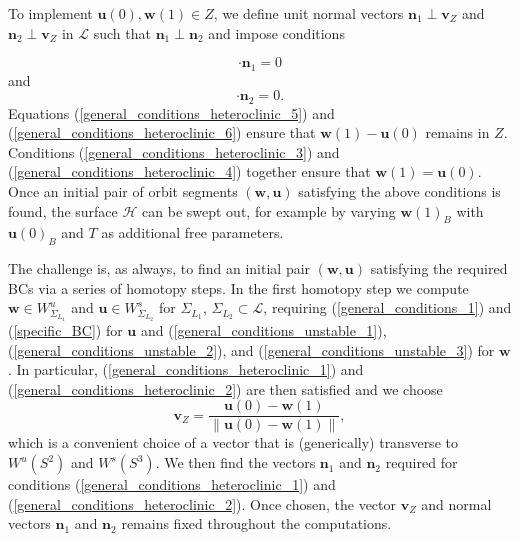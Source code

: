 \documentclass{ws-ijbc}
\begin{document}
To implement $\mathbf{u}(0), \mathbf{w}(1) \in Z$, we define unit normal vectors $\mathbf{n}_1 \perp \mathbf{v}_Z$ and $\mathbf{n}_2 \perp \mathbf{v}_Z$ in $\mathscr{L}$ such that $\mathbf{n}_1 \perp \mathbf{n}_2$ and impose conditions

\begin{equation}
	[\mathbf{u}(0) - \mathbf{w}(1)] \cdot \mathbf{n}_1 =0
	\label{general_conditions_heteroclinic_5}
\end{equation}
and
\begin{equation}	
	 [\mathbf{u}(0) - \mathbf{w}(1)] \cdot \mathbf{n}_2 =0.
	 \label{general_conditions_heteroclinic_6}
\end{equation}
Equations (\ref{general_conditions_heteroclinic_5}) and (\ref{general_conditions_heteroclinic_6}) ensure that $\mathbf{w}(1)-\mathbf{u}(0)$ remains in $Z$.  Conditions (\ref{general_conditions_heteroclinic_3}) and (\ref{general_conditions_heteroclinic_4}) together ensure that $\mathbf{w}(1) = \mathbf{u}(0)$.  Once an initial pair of orbit segments $(\mathbf{w}, \mathbf{u})$ satisfying the above conditions is found, the surface $\mathscr{H}$ can be swept out, for example by varying $\mathbf{w}(1)_B$ with $\mathbf{u}(0)_B$ and $T$ as additional free parameters.  

The challenge is, as always, to find an initial pair $(\mathbf{w}, \mathbf{u})$ satisfying the required BCs via a series of homotopy steps.  In the first homotopy step we compute $\mathbf{w} \in W^u_{\Sigma_{L_1}}$ and $\mathbf{u} \in W^s_{\Sigma_{L_2}}$ for $\Sigma_{L_1} $, $\Sigma_{L_2} \subset \mathscr{L}$, requiring (\ref{general_conditions_1}) and (\ref{specific_BC}) for $\mathbf{u}$ and (\ref{general_conditions_unstable_1}), (\ref{general_conditions_unstable_2}), and (\ref{general_conditions_unstable_3}) for $\mathbf{w}$.  In particular, (\ref{general_conditions_heteroclinic_1}) and (\ref{general_conditions_heteroclinic_2}) are then satisfied and we choose
	\begin{equation*}
		\mathbf{v}_Z = \frac{\mathbf{u}(0) - \mathbf{w}(1)}{\left\lVert \mathbf{u}(0) - \mathbf{w}(1) \right\lVert},
		\label{Lin_vector}
	\end{equation*}
which is a convenient choice of a vector that is (generically) transverse to $W^u(S^2)$ and $W^s(S^3)$. We then find the vectors $\mathbf{n}_1$ and $\mathbf{n}_2$ required for conditions (\ref{general_conditions_heteroclinic_1}) and  (\ref{general_conditions_heteroclinic_2}). Once chosen, the vector $\mathbf{v}_Z$ and normal vectors $\mathbf{n}_1$ and $\mathbf{n}_2$ remains fixed throughout the computations.
\end{document}
